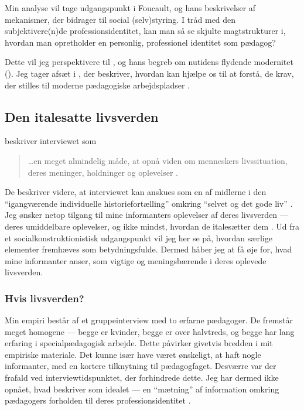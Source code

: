 Min analyse vil tage udgangspunkt i Foucault, og hans beskrivelser af mekanismer, der bidrager til social (selv)styring.
I tråd med den subjektivere(n)de professionsidentitet, kan man så se skjulte magtstrukturer i, hvordan man opretholder en personlig, professionel identitet som pædagog?

Dette vil jeg perspektivere til \citeauthor{baumanLiquidModernity2000}, og hans begreb om nutidens flydende modernitet (\citeyear{baumanLiquidModernity2000}).
Jeg tager afsæt i \citeauthor{kofodOrganisationOgLedelse2016}, der beskriver, hvordan \citeauthor{baumanLiquidModernity2000} kan hjælpe os til at forstå, de krav, der stilles til moderne pædagogiske arbejdspladser \autocite{kofodOrganisationOgLedelse2016}.


\subsection{Den italesatte livsverden}
\citeauthor{tanggaardInterviewetSamtalenSom2015} beskriver interviewet som

\begin{quote}
\ldots en meget almindelig måde, at opnå viden om menneskers livssituation, deres meninger, holdninger og oplevelser \autocite[s. 29]{tanggaardInterviewetSamtalenSom2015}.
\end{quote}

De beskriver videre, at interviewet kan anskues som en af midlerne i den “igangværende individuelle historiefortælling” omkring “selvet og det gode liv” \autocite[s. 30]{tanggaardInterviewetSamtalenSom2015}.
Jeg ønsker netop tilgang til mine informanters oplevelser af deres livsverden — deres umiddelbare oplevelser, og ikke mindst, hvordan de italesætter dem \autocite[s. 31]{tanggaardInterviewetSamtalenSom2015}.
Ud fra et socialkonstruktionistisk udgangspunkt vil jeg her se på, hvordan særlige elementer fremhæves som betydningsfulde.
Dermed håber jeg at få øje for, hvad mine informanter anser, som vigtige og meningsbærende i deres oplevede livsverden.

\subsubsection{Hvis livsverden?}
Min empiri består af et gruppeinterview med to erfarne pædagoger.
De fremstår meget homogene — begge er kvinder, begge er over halvtreds, og begge har lang erfaring i specialpædagogisk arbejde.
Dette påvirker givetvis bredden i mit empiriske materiale.
Det kunne især have været ønskeligt, at haft nogle informanter, med en kortere tilknytning til pædagogfaget.
Desværre var der frafald ved interviewtidspunktet, der forhindrede dette.
Jeg har dermed ikke opnået, hvad \autocite{tanggaardInterviewetSamtalenSom2015} beskriver som idealet — en “mætning” af information omkring pædagogers forholden til deres professionsidentitet \autocite[s. 32]{tanggaardInterviewetSamtalenSom2015}.

